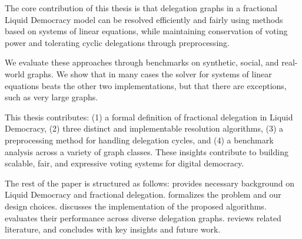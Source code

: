 The core contribution of this thesis is that delegation graphs in a fractional Liquid Democracy model can be resolved efficiently and fairly using methods based on systems of linear equations, while maintaining conservation of voting power and tolerating cyclic delegations through preprocessing.

We evaluate these approaches through benchmarks on synthetic, social, and real-world graphs. We show that in many cases the solver for systems of linear equations beats the other two implementations, but that there are exceptions, such as very large graphs.

This thesis contributes: (1) a formal definition of fractional delegation in Liquid Democracy, (2) three distinct and implementable resolution algorithms, (3) a preprocessing method for handling delegation cycles, and (4) a benchmark analysis across a variety of graph classes. These insights contribute to building scalable, fair, and expressive voting systems for digital democracy.

The rest of the paper is structured as follows:  provides necessary background on Liquid Democracy and fractional delegation.  formalizes the problem and our design choices.  discusses the implementation of the proposed algorithms.  evaluates their performance across diverse delegation graphs.  reviews related literature, and  concludes with key insights and future work.